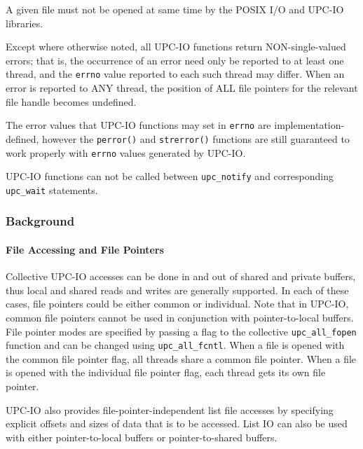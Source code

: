 \np A given file must not be opened at same time by the POSIX I/O
and UPC-IO libraries.

\np Except where otherwise noted, all UPC-IO functions return
NON-single-valued errors; that is, the occurrence of an error need only be
reported to at least one thread, and the {\tt errno} value reported to each such
thread may differ. When an error is reported to ANY thread, the position of
ALL file pointers for the relevant file handle becomes undefined.

\np The error values that UPC-IO functions may set in {\tt errno} are
implementation-defined, however the {\tt perror()} and {\tt strerror()} functions are still
guaranteed to work properly with {\tt errno} values generated by UPC-IO.

\np UPC-IO functions can not be called between {\tt upc\_notify} and corresponding {\tt upc\_wait} statements.

\subsubsection{Background}

\paragraph{File Accessing and File Pointers}



\npf Collective UPC-IO accesses can be done in and out of shared and private
buffers, thus local and shared reads and writes are generally supported.
In each of these cases, file pointers could be either common or individual.
Note that in UPC-IO, common file pointers cannot be used in conjunction with
pointer-to-local buffers. 
File pointer modes are specified by passing a flag to the collective
{\tt upc\_all\_fopen} function and can be changed using {\tt upc\_all\_fcntl}.
When a file is opened with the common file pointer flag, all threads share a
common file pointer. When a file is opened with the individual file pointer
flag, each thread gets its own file pointer.

\np UPC-IO also provides file-pointer-independent list file accesses by specifying
explicit offsets and sizes of data that is to be accessed. List IO can also
be used with either pointer-to-local buffers or pointer-to-shared buffers.

